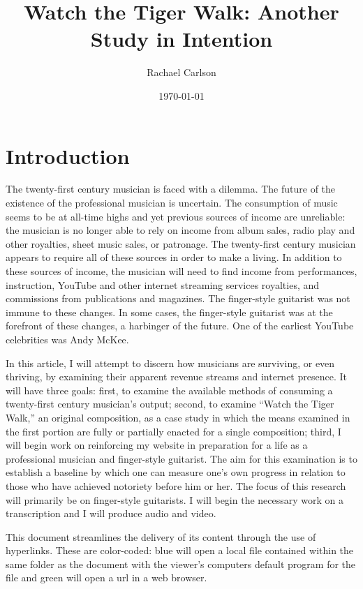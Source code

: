\documentclass[unicode,hyperfootnotes=false,xetex,colorlinks=true,nofonts,nobib]{tufte-handout}
\title{Watch the Tiger Walk: Another Study in Intention}
\author{Rachael Carlson}
\date{\today}
\begin{document}
\maketitle{}
\section{Introduction}
The twenty-first century musician is faced with a dilemma. The future of the existence of the professional musician is uncertain. The consumption of music seems to be at all-time highs and yet previous sources of income are unreliable: the musician is no longer able to rely on income from album sales, radio play and other royalties, sheet music sales, or patronage. The twenty-first century musician appears to require all of these sources in order to make a living. In addition to these sources of income, the musician will need to find income from performances, instruction, YouTube and other internet streaming services royalties, and commissions from publications and magazines. The finger-style guitarist was not immune to these changes. In some cases, the finger-style guitarist was at the forefront of these changes, a harbinger of the future. One of the earliest YouTube celebrities was Andy McKee.

In this article, I will attempt to discern how musicians are surviving, or even thriving, by examining their apparent revenue streams and internet presence. It will have three goals: first, to examine the available methods of consuming a twenty-first century musician's output; second, to examine ``Watch the Tiger Walk,'' an original composition, as a case study in which the means examined in the first portion are fully or partially enacted for a single composition; third, I will begin work on reinforcing my website in preparation for a life as a professional musician and finger-style guitarist. The aim for this examination is to establish a baseline by which one can measure one's own progress in relation to those who have achieved notoriety before him or her. The focus of this research will primarily be on finger-style guitarists. I will begin the necessary work on a transcription and I will produce audio and video.  

This document streamlines the delivery of its content through the use of hyperlinks. These are color-coded: blue will open a local file contained within the same folder as the document with the viewer's computers default program for the file and green will open a url in a web browser.
\end{document}

